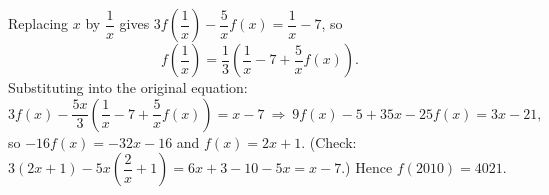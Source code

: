 Replacing $x$ by $\dfrac{1}{x}$ gives $3f\!\left(\dfrac{1}{x}\right)-\dfrac{5}{x} f(x)=\dfrac{1}{x}-7$, so
\[f\!\left(\dfrac{1}{x}\right)=\dfrac{1}{3}\left(\dfrac{1}{x}-7+\dfrac{5}{x}f(x)\right).\]
Substituting into the original equation:
\[3f(x)-\dfrac{5x}{3}\left(\dfrac{1}{x}-7+\dfrac{5}{x} f(x)\right)=x-7\ \Longrightarrow\ 9f(x)-5+35x-25f(x)=3x-21,\]
so $-16f(x)=-32x-16$ and $f(x)=2x+1$. (Check: $3(2x+1)-5x\left(\dfrac{2}{x}+1\right)=6x+3-10-5x=x-7$.) Hence $f(2010)=\boxed{4021}$.
